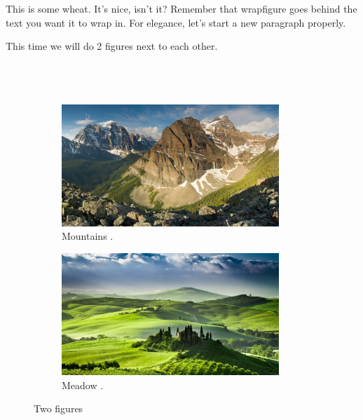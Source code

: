 \documentclass[a4paper]{report}
\begin{document}
This is some wheat. It's nice, isn't it? Remember that wrapfigure goes behind the text you want it to wrap in. For elegance, let's start a new paragraph properly.
\par
This time we will do 2 figures next to each other.\\\\
\\
\\



\begin{figure}[h]
	
	\begin{subfigure}{.5\textwidth}
		\centering
		\includegraphics[width = 0.9\textwidth]{Mountains}
		\caption{Mountains \cite{Nature}.}
	\end{subfigure}%
	\begin{subfigure}{.5\textwidth}
		\centering
		\includegraphics[width = 0.9\textwidth]{Meadow}
		\caption{Meadow \cite{Nature}.}
	\end{subfigure}
	\caption{Two figures}
	
\end{figure}
\end{document}

